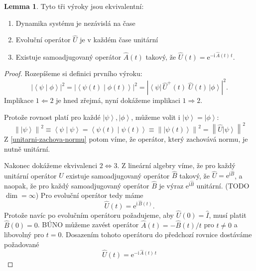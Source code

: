 \documentclass[10pt,a4paper]{report}
\theoremstyle{definition}
\newtheorem{lemma}[theorem]{Lemma}
\newcommand{\const}[1]{\mathrm{#1}}
\newcommand{\norm}[1]{\left\lVert#1\right\rVert}
\newcommand{\abs}[1]{\left| #1 \right|}
\newcommand{\bra}[1]{\left< #1 \right|}
\newcommand{\ket}[1]{\left| #1 \right>}
\newcommand{\braket}[2]{\left< #1 \middle| #2 \right>}
\newcommand{\e}[1]{\const{e}^{#1}}
\newcommand{\I}{\const{i}}
\def\1{\hat{I}}
\begin{document}
\begin{lemma} \label{dyn-sys-charakteristika}
    Tyto tři výroky jsou ekvivalentní:
    \begin{enumerate}
        \item Dynamika systému je nezávislá na čase
        \item Evoluční operátor $\hat U$ je v každém čase unitární
        \item Existuje samoadjugovaný operátor $\hat A(t)$ takový, že $\hat{U}(t) = \e{-\I \, \hat{A}(t) \, t}$.
    \end{enumerate}
\end{lemma}
\begin{proof}
    Rozepíšeme si definici prvního výroku:
    \begin{equation*}
        \abs{\braket{\psi}{\phi}}^2 = \abs{\braket{\psi(t)}{\phi(t)}}^2 = \abs{\bra{\psi} \, \hat{U}^+\!(t) \; \hat{U}(t) \, \ket{\phi}}^2.
    \end{equation*}
    Implikace $1 \Leftarrow 2$ je hned zřejmá, nyní dokážeme implikaci $1 \Rightarrow 2$.

    Protože rovnost platí pro každé $\ket{\psi}, \ket{\phi}$, můžeme volit i $\ket{\psi} = \ket{\phi}$:
    \begin{equation*}
        \norm{\ket\psi}^2
        \equiv \braket{\psi}{\psi}
        = \braket{\psi(t)}{\psi(t)}
        \equiv \norm{\ket{\psi(t)}}^2
        = \norm{\hat U \ket\psi}^2
    \end{equation*}
    Z \ref{unitarni-zachova-normu} potom víme, že operátor, který zachovává normu, je nutně unitární.

    Nakonec dokážeme ekvivalenci $2 \Leftrightarrow 3$. Z lineární algebry víme, že pro každý unitární operátor $\hat U$ existuje samoadjugovaný operátor $\hat B$ takový, že $\hat U = \e{ \I \hat B}$, a naopak, že pro každý samoadjugovaný operátor $\hat B$ je výraz $\e{ \I \hat B}$ unitární. (TODO $\dim = \infty$) Pro evoluční operátor tedy máme
    \begin{equation*}
        \hat U(t) = \e{\I \, \hat B(t)}.
    \end{equation*}
    Protože navíc po evolučním operátoru požadujeme, aby $\hat U(0) = \1$, musí platit $\hat B(0) = 0$. BÚNO můžeme zavést operátor $\hat A(t) = - \hat B(t) / t$ pro $t \neq 0$ a libovolný pro $t=0$. Dosazením tohoto operátoru do předchozí rovnice dostáváme požadované
    \begin{equation*}
        \hat U(t) = \e{-\I \, \hat A(t) \, t}
    \end{equation*}
\end{proof}
\end{document}
